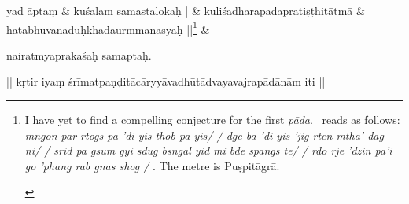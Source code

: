 \documentclass[naipra.tex]{subfiles}
\begin{document}
\begin{sanskrit}
% 
%   


\medskip\versequote
{} yad āptaṃ &
\hspace{20pt} kuśalam  samastalokaḥ | \&
\versequote
kuliśadharapadapratiṣṭhitātmā &
\hspace{20pt} hatabhuvanaduḥkhadaurmmanasyaḥ ||\footnote{\begin{english}
	I have yet to find a compelling conjecture for the first \emph{pāda}.
	\TIB\ reads as follows: \emph{%
		mngon par rtogs pa 'di yis thob pa yis/ /
		dge ba 'di yis 'jig rten mtha' dag ni/ /
		srid pa gsum gyi sdug bsngal yid mi bde spangs te/ / 
		rdo rje 'dzin pa'i go 'phang rab gnas shog /
	}. The metre is Puṣpitāgrā.
\end{english}} \&




\medskip\pstart
nairātmyāprakāśaḥ samāptaḥ. 
\pend

\bigskip\pstart
\begin{center}
|| kṛtir iyaṃ śrīmatpaṇḍitācāryyāvadhūtādvayavajrapādānām iti ||
\end{center}
\pend



\end{sanskrit}
\endnumbering
\end{document}
